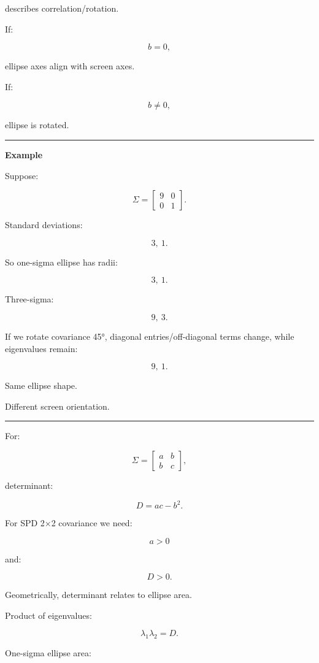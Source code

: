 describes correlation/rotation.

If:

\[
b=0,
\]

ellipse axes align with screen axes.

If:

\[
b\ne0,
\]

ellipse is rotated.

\begin{center}\rule{0.5\linewidth}{0.5pt}\end{center}

\textbf{Example}

Suppose:

\[
\Sigma=
\begin{bmatrix}
9&0\\
0&1
\end{bmatrix}.
\]

Standard deviations:

\[
3,\ 1.
\]

So one-sigma ellipse has radii:

\[
3,\ 1.
\]

Three-sigma:

\[
9,\ 3.
\]

If we rotate covariance 45°, diagonal entries/off-diagonal terms change, while eigenvalues remain:

\[
9,\ 1.
\]

Same ellipse shape.

Different screen orientation.

\begin{center}\rule{0.5\linewidth}{0.5pt}\end{center}

For:

\[
\Sigma=
\begin{bmatrix}
a&b\\
b&c
\end{bmatrix},
\]

determinant:

\[
\boxed{
D=ac-b^2.
}
\]

For SPD 2×2 covariance we need:

\[
a>0
\]

and:

\[
D>0.
\]

Geometrically, determinant relates to ellipse area.

Product of eigenvalues:

\[
\lambda_1\lambda_2=D.
\]

One-sigma ellipse area:

